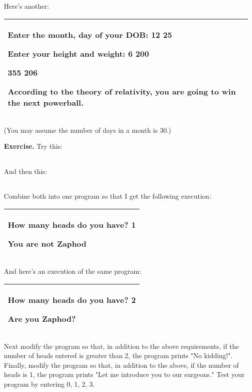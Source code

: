 \documentclass[
]{article}
\begin{document}
Here's another:

\begin{longtable}[]{@{}l@{}}
\toprule
\endhead
\begin{minipage}[t]{0.97\columnwidth}\raggedright
Enter the month, day of your DOB: \textbf{12 25}

Enter your height and weight: \textbf{6 200}

355 206

According to the theory of relativity, you are going to win the next
powerball.\strut
\end{minipage}\tabularnewline
\bottomrule
\end{longtable}

(You may assume the number of days in a month is 30.)

\textbf{Exercise. }Try this:

\begin{longtable}[]{@{}@{}}
\toprule
\endhead
\bottomrule
\end{longtable}

And then this:

\begin{longtable}[]{@{}@{}}
\toprule
\endhead
\bottomrule
\end{longtable}

Combine both into one program so that I get the following execution:

\begin{longtable}[]{@{}l@{}}
\toprule
\endhead
\begin{minipage}[t]{0.97\columnwidth}\raggedright
How many heads do you have? \textbf{1}

You are not Zaphod\strut
\end{minipage}\tabularnewline
\bottomrule
\end{longtable}

And here's an execution of the same program:

\begin{longtable}[]{@{}l@{}}
\toprule
\endhead
\begin{minipage}[t]{0.97\columnwidth}\raggedright
How many heads do you have? \textbf{2}

Are you Zaphod?\strut
\end{minipage}\tabularnewline
\bottomrule
\end{longtable}

Next modify the program so that, in addition to the above requirements,
if the number of heads entered is greater than 2, the program prints "No
kidding!". Finally, modify the program so that, in addition to the
above, if the number of heads is 1, the program prints "Let me introduce
you to our surgeons." Test your program by entering 0, 1, 2, 3.
\end{document}
